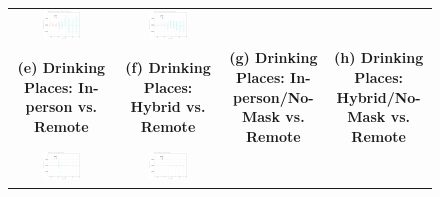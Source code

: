 \documentclass[9pt,twoside,lineno]{pnas-new}
\theoremstyle{definition}
\begin{document}
\begin{figure}[!ht]
{\begin{minipage}{\linewidth}
\begin{tabular}{cccc}
 \includegraphics[width=0.4\textwidth]{tables_and_figures/event_restaurant_csfullno.pdf}& \includegraphics[width=0.4\textwidth]{tables_and_figures/event_restaurant_cshybridno.pdf}  \smallskip\\ 
 \textbf{(e) Drinking Places: In-person vs. Remote }&\textbf{(f) Drinking Places: Hybrid vs. Remote}&\textbf{(g) Drinking Places: In-person/No-Mask vs. Remote}&\textbf{(h) Drinking Places:  Hybrid/No-Mask vs. Remote}\smallskip\\ 
 \includegraphics[width=0.4\textwidth]{tables_and_figures/event_bar_csfull.pdf}& \includegraphics[width=0.4\textwidth]{tables_and_figures/event_bar_cshybrid.pdf} 
 &

\end{tabular}
\end{minipage}}
\end{figure}
\end{document}
